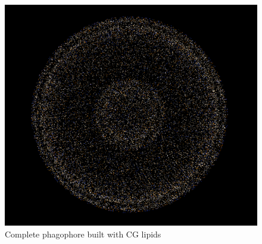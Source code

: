 \documentclass[12pt, a4paper]{report}
\begin{document}
\begin{figure}[h]
    \includegraphics[scale=1]{images/cg full.png} 
    \centering 
    \caption{Complete phagophore built with CG lipids}
    \centering
\end{figure} 
\end{document}
